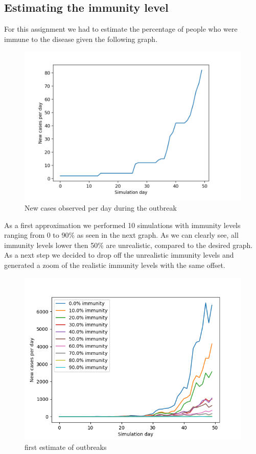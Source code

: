 \documentclass[runningheads]{llncs}
\begin{document}
\subsection{Estimating the immunity level}
For this assignment we had to estimate the percentage of people who were immune to the disease given the following graph.
\\ 
\begin{figure}[h!]
	\includegraphics[width=\textwidth]{original.png}
	\caption{New cases observed per day during the outbreak}
\end{figure}
\newpage
As a first approximation we performed 10 simulations with immunity levels ranging from 0 to 90\% as seen in the next graph. As we can clearly see, all immunity levels lower then 50\% are unrealistic, compared to the desired graph. As a next step we decided to drop off the unrealistic immunity levels and generated a zoom of the realistic immunity levels with the same offset.
\begin{figure}
	\includegraphics[width=\textwidth]{test_immunity_0-100.png}
	\caption{first estimate of outbreaks}
\end{figure}
\newpage
\end{document}
